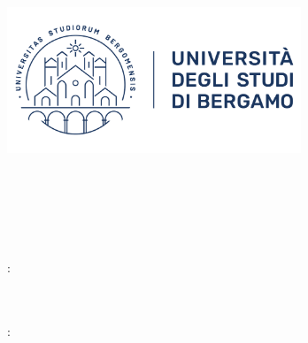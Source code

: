 \makeatletter
\includegraphics[width=8.79cm]{images/unibg-logo-wide.png}

\vspace{0.5cm}

\begin{changemargin}{4cm}{0cm}
  \@trDepartment \\
  \@department

  \vspace{0.5cm}

  \@trCourseB \\
  \@course

  \vspace{0.1cm}

  \@trClass~\@class

  \vfill

  {\Huge\textbf{\@title}}

  {\LARGE\@subtitle}

  \vfill

  \begin{multicols}{2}
  \@trCandidato: \\ \textit{\@author} \\
  \@trStudentNumber~\@studentid

  \columnbreak
  
  \@trAdvisor: \\ \textit{\@advisor}
  
  \vspace{0.5cm}
  
  \ifthenelse{\equal{\@coadvisor}{}}{}{\@trCoAdvisor: \\ \textit{\@coadvisor}}
  \end{multicols}

  \vfill

  \@trAnnoAccademico \\
  \@academicyear

\end{changemargin}
\makeatother
